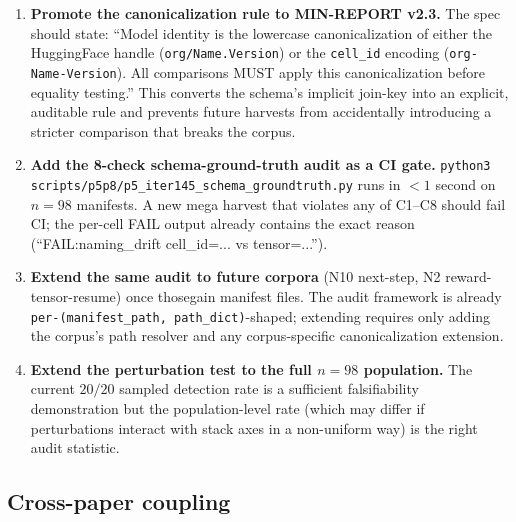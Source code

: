 \begin{enumerate}
\item \textbf{Promote the canonicalization rule to MIN-REPORT v2.3.} The
spec should state: ``Model identity is the lowercase canonicalization of
either the HuggingFace handle (\texttt{org/Name.Version}) or the
\texttt{cell\_id} encoding (\texttt{org-Name-Version}). All comparisons
MUST apply this canonicalization before equality testing.'' This converts
the schema's implicit join-key into an explicit, auditable rule and prevents
future harvests from accidentally introducing a stricter comparison that
breaks the corpus.

\item \textbf{Add the 8-check schema-ground-truth audit as a CI gate.}
\texttt{python3 scripts/p5p8/p5\_iter145\_schema\_groundtruth.py} runs in
$<1$ second on $n = 98$ manifests. A new mega harvest that violates any of
C1--C8 should fail CI; the per-cell FAIL output already contains the exact
reason (``FAIL:naming\_drift cell\_id=... vs tensor=...'').

\item \textbf{Extend the same audit to future corpora} (N10 next-step,
N2 reward-tensor-resume) once thosegain manifest files. The audit framework
is already \texttt{per-(manifest\_path, path\_dict)}-shaped; extending
requires only adding the corpus's path resolver and any
corpus-specific canonicalization extension.

\item \textbf{Extend the perturbation test to the full $n = 98$ population.}
The current $20/20$ sampled detection rate is a sufficient falsifiability
demonstration but the population-level rate (which may differ if perturbations
interact with stack axes in a non-uniform way) is the right audit statistic.
\end{enumerate}

\subsection*{Cross-paper coupling}

